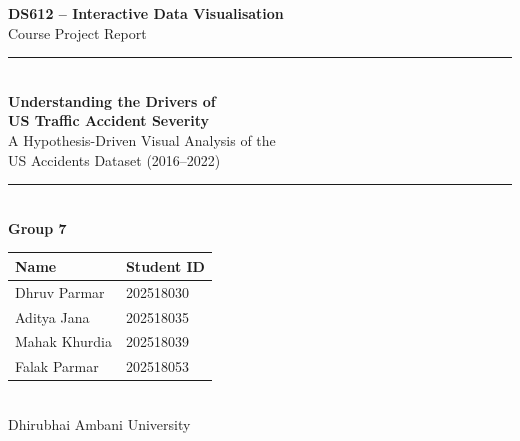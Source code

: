 \begin{titlepage}
\thispagestyle{empty}
  \centering
  \vspace*{1cm}

  {\LARGE \textbf{DS612 – Interactive Data Visualisation}}\\[0.4em]
  {\large Course Project Report}\\[2em]

  \rule{\linewidth}{1pt}\\[0.8em]
  {\huge \textbf{Understanding the Drivers of\\[0.3em]
  US Traffic Accident Severity}}\\[0.5em]
  {\large A Hypothesis-Driven Visual Analysis of the\\
  US Accidents Dataset (2016–2022)}\\[0.8em]
  \rule{\linewidth}{1pt}\\[2em]

  {\large \textbf{Group 7}}\\[1.5em]

  \begin{tabular}{ll}
    \toprule
    \textbf{Name}    & \textbf{Student ID} \\
    \midrule
    Dhruv Parmar     & 202518030 \\
    Aditya Jana      & 202518035 \\
    Mahak Khurdia    & 202518039 \\
    Falak Parmar     & 202518053 \\
    \bottomrule
  \end{tabular}\\[2em]

  \vfill
  {\large Dhirubhai Ambani University}
\end{titlepage}
\clearpage   %